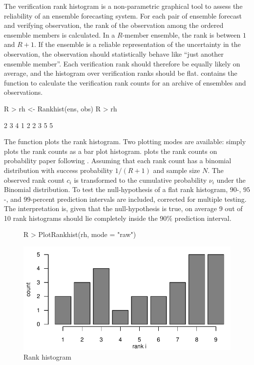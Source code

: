 \documentclass[article]{jss}
\begin{document}
The verification rank histogram \citep{hamill2001interpretation} is a non-parametric graphical tool to assess the reliability of an ensemble forecasting system.
For each pair of ensemble forecast and verifying observation, the rank of the observation among the ordered ensemble members is calculated.
In a $R$-member ensemble, the rank is between $1$ and $R+1$.
If the ensemble is a reliable representation of the uncertainty in the observation, the observation should statistically behave like ``just another ensemble member''. 
Each verification rank should therefore be equally likely on average, and the histogram over verification ranks should be flat. 
 contains the function  to calculate the verification rank counts for an archive of ensembles and observations.
%
\begin{Schunk}
\begin{Sinput}
R > rh <- Rankhist(ens, obs)
R > rh
\end{Sinput}
\begin{Soutput}
[1] 2 3 4 1 2 2 3 5 5
\end{Soutput}
\end{Schunk}
%


The function  plots the rank histogram.
Two plotting modes are available:
 simply plots the rank counts as a bar plot histogram.
 plots the rank counts on probability paper following \citet{broecker2008reliability}. 
Assuming that each rank count has a binomial distribution with success probability $1/(R+1)$ and sample size $N$.
The observed rank count $c_i$ is transformed to the cumulative probability $\nu_i$ under the Binomial distribution.
To test the null-hypothesis of a flat rank histogram, $90$-, $95$-, and $99$-percent prediction intervals are included, corrected for multiple testing.
The interpretation is, given that the null-hypothesis is true, on average 9 out of 10 rank histograms should lie completely inside the $90\%$ prediction interval.



\begin{figure}
\begin{center}
%
\begin{Schunk}
\begin{Sinput}
R > PlotRankhist(rh, mode = "raw")
\end{Sinput}
\end{Schunk}
\includegraphics{fig-rank-hist}
%
\end{center}
\caption{Rank histogram}
\label{fig:rank-hist}
\end{figure}
\end{document}
